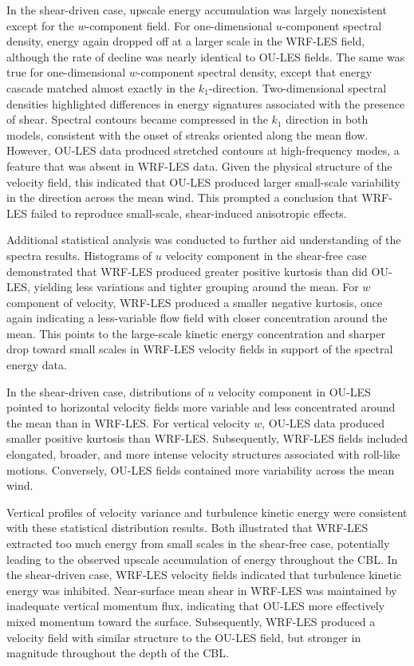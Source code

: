 In the shear-driven case, upscale energy accumulation was largely nonexistent except for the $w$-component field. For one-dimensional $u$-component spectral density, energy again dropped off at a larger scale in the WRF-LES field, although the rate of decline was nearly identical to OU-LES fields. The same was true for one-dimensional $w$-component spectral density, except that energy cascade matched almost exactly in the $k_1$-direction. Two-dimensional spectral densities highlighted differences in energy signatures associated with the presence of shear. Spectral contours became compressed in the $k_1$ direction in both models, consistent with the onset of streaks oriented along the mean flow. However, OU-LES data produced stretched contours at high-frequency modes, a feature that was absent in WRF-LES data. Given the physical structure of the velocity field, this indicated that OU-LES produced larger small-scale variability in the direction across the mean wind. This prompted a conclusion that WRF-LES failed to reproduce small-scale, shear-induced anisotropic effects.

Additional statistical analysis was conducted to further aid understanding of the spectra results. Histograms of $u$ velocity component in the shear-free case demonstrated that WRF-LES produced greater positive kurtosis than did OU-LES, yielding less variations and tighter grouping around the mean. For $w$ component of velocity, WRF-LES produced a smaller negative kurtosis, once again indicating a less-variable flow field with closer concentration around the mean. This points to the large-scale kinetic energy concentration and sharper drop toward small scales in WRF-LES velocity fields in support of the spectral energy data.

In the shear-driven case, distributions of $u$ velocity component in OU-LES pointed to horizontal velocity fields more variable and less concentrated around the mean than in WRF-LES. For vertical velocity $w$, OU-LES data produced smaller positive kurtosis than WRF-LES. Subsequently, WRF-LES fields included elongated, broader, and more intense velocity structures associated with roll-like motions. Conversely, OU-LES fields contained more variability across the mean wind.

Vertical profiles of velocity variance and turbulence kinetic energy were consistent with these statistical distribution results. Both illustrated that WRF-LES extracted too much energy from small scales in the shear-free case, potentially leading to the observed upscale accumulation of energy throughout the CBL. In the shear-driven case, WRF-LES velocity fields indicated that turbulence kinetic energy was inhibited. Near-surface mean shear in WRF-LES was maintained by inadequate vertical momentum flux, indicating that OU-LES more effectively mixed momentum toward the surface. Subsequently, WRF-LES produced a velocity field with similar structure to the OU-LES field, but stronger in magnitude throughout the depth of the CBL.

